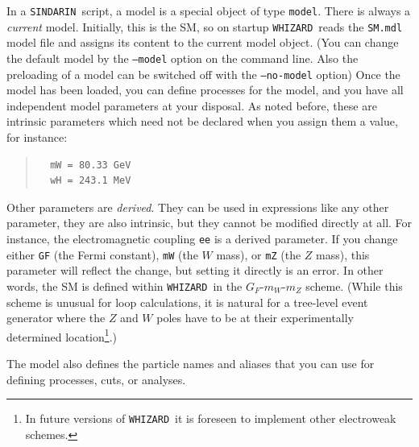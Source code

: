 \documentclass[12pt]{book}
\newcommand{\ttt}[1]{\texttt{#1}}
\newcommand{\whizard}{\ttt{WHIZARD}}
\newcommand{\sindarin}{\ttt{SINDARIN}}
\begin{document}
In a \sindarin\ script, a model is a special object of type \ttt{model}.  There
is always a \emph{current} model.  Initially, this is the SM, so on startup
\whizard\ reads the \ttt{SM.mdl} model file and assigns its content to the
current model object.  (You can change the default model by the \ttt{--model}
option on the command line. Also the preloading of a model can be
switched off with the \ttt{--no-model} option)  Once the model has
been loaded, you can define processes for the model, and you have all
independent model parameters at your disposal.  As noted before, these
are intrinsic parameters which need not be declared when you assign
them a value, for instance:
\begin{quote}
\begin{footnotesize}
\begin{verbatim}
  mW = 80.33 GeV
  wH = 243.1 MeV
\end{verbatim}
\end{footnotesize}
\end{quote}
Other parameters are \emph{derived}.  They can be used in expressions like any
other parameter, they are also intrinsic, but they cannot be modified directly
at all.  For instance, the electromagnetic coupling \ttt{ee} is a derived
parameter.  If you change either \ttt{GF} (the Fermi constant), \ttt{mW} (the
$W$ mass), or \ttt{mZ} (the $Z$ mass), this parameter will reflect the change,
but setting it directly is an error.  In other words, the SM is defined within
\whizard\ in the $G_F$-$m_W$-$m_Z$ scheme.  (While this scheme is unusual for
loop calculations, it is natural for a tree-level event generator where the
$Z$ and $W$ poles have to be at their experimentally determined
location\footnote{In future versions of \whizard\ it is foreseen to
  implement other electroweak schemes.}.)

The model also defines the particle names and aliases that you can use for
defining processes, cuts, or analyses.
\end{document}
